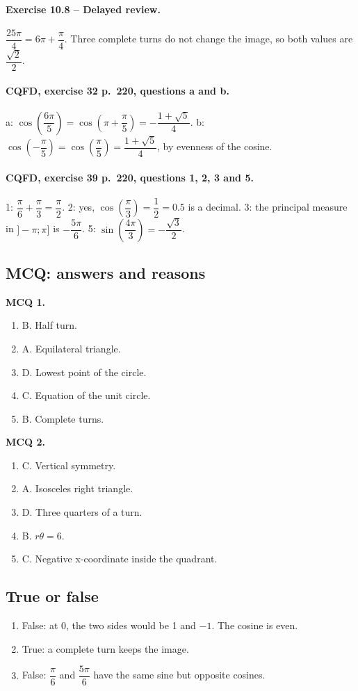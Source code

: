 \paragraph{Exercise 10.8 -- Delayed review.} $\dfrac{25\pi}{4}=6\pi +\dfrac{\pi}{4}$. Three complete turns do not change the image, so both values are $\dfrac{\sqrt 2}{2}$.
\paragraph{CQFD, exercise 32 p.~220, questions a and b.} a: $\cos(\dfrac{6\pi}5)=\cos(\pi+\dfrac\pi5)=-\dfrac{1+\sqrt5}{4}$. b: $\cos(-\dfrac\pi5)=\cos(\dfrac\pi5)=\dfrac{1+\sqrt5}{4}$, by evenness of the cosine.
\paragraph{CQFD, exercise 39 p.~220, questions 1, 2, 3 and 5.} 1: $\dfrac\pi6+\dfrac\pi3=\dfrac\pi2$. 2: yes, $\cos(\dfrac\pi3)=\dfrac12=0.5$ is a decimal. 3: the principal measure in $]-\pi;\pi]$ is $-\dfrac{5\pi}6$. 5: $\sin(\dfrac{4\pi}3)=-\dfrac{\sqrt3}2$.
\subsection*{MCQ: answers and reasons}
\textbf{MCQ 1.}
\begin{enumerate}
\item B. Half turn.
\item A. Equilateral triangle.
\item D. Lowest point of the circle.
\item C. Equation of the unit circle.
\item B. Complete turns.
\end{enumerate}
\textbf{MCQ 2.}
\begin{enumerate}
\item C. Vertical symmetry.
\item A. Isosceles right triangle.
\item D. Three quarters of a turn.
\item B. $r\theta=6$.
\item C. Negative x-coordinate inside the quadrant.
\end{enumerate}
\subsection*{True or false}
\begin{enumerate}
\item False: at 0, the two sides would be 1 and $-1$. The cosine is even.
\item True: a complete turn keeps the image.
\item False: $\dfrac{\pi}{6}$ and $\dfrac{5\pi}{6}$ have the same sine but opposite cosines.
\end{enumerate}
